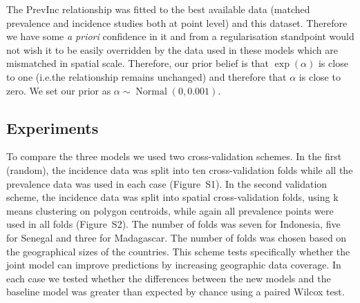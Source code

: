 \documentclass{statsoc}
\begin{document}
The PrevInc relationship was fitted to the best available data (matched prevalence and incidence studies both at point level) and this dataset.
Therefore we have some \emph{a priori} confidence in it and from a regularisation standpoint would not wish it to be easily overridden by the data used in these models which are mismatched in spatial scale.
Therefore, our prior belief is that $\exp(\alpha)$ is close to one (i.e.\thinspace the relationship remains unchanged) and therefore that $\alpha$ is close to zero.
We set our prior as $\alpha \sim \operatorname{Normal}(0, 0.001)$.


\subsection*{Experiments}

To compare the three models we used two cross-validation schemes. 
In the first (random), the incidence data was split into ten cross-validation folds while all the prevalence data was used in each case (Figure~S1). 
In the second validation scheme, the incidence data was split into spatial cross-validation folds, using k means clustering on polygon centroids, while again all prevalence points were used in all folds (Figure~S2).
The number of folds was seven for Indonesia, five for Senegal and three for Madagascar.
The number of folds was chosen based on the geographical sizes of the countries.
This scheme tests specifically whether the joint model can improve predictions by increasing geographic data coverage.
In each case we tested whether the differences between the new models and the baseline model was greater than expected  by chance using a paired Wilcox test.



\begin{table}
\caption{\label{table1}Summary of out-of-sample accuracy for all cross-validation experiments. 
Mean absolute error of predicted incidence rate against out-of-sample observed data for three countries. 
Results that are significantly better or worse than the baseline (at the 95\% significance level) are indicated with a dagger.
}
\centering
{}
\end{table}
\end{document}
